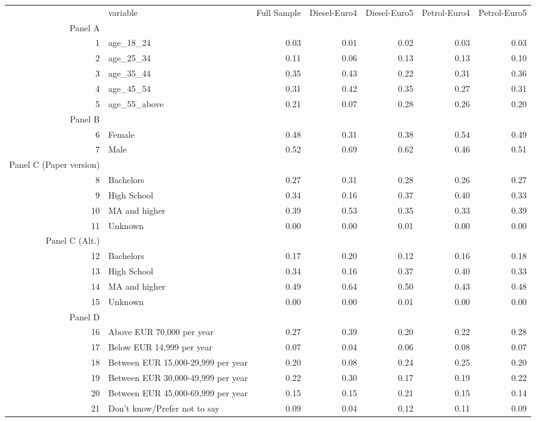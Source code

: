 \begin{table}[ht]
\centering
\begin{tabular}{rlrrrrr}
  \hline
 & variable & Full Sample & Diesel-Euro4 & Diesel-Euro5 & Petrol-Euro4 & Petrol-Euro5 \\ 
  Panel A & \multicolumn{5}{c}{} \\ 
 \hline
1 & age\_18\_24 & 0.03 & 0.01 & 0.02 & 0.03 & 0.03 \\ 
  2 & age\_25\_34 & 0.11 & 0.06 & 0.13 & 0.13 & 0.10 \\ 
  3 & age\_35\_44 & 0.35 & 0.43 & 0.22 & 0.31 & 0.36 \\ 
  4 & age\_45\_54 & 0.31 & 0.42 & 0.35 & 0.27 & 0.31 \\ 
  5 & age\_55\_above & 0.21 & 0.07 & 0.28 & 0.26 & 0.20 \\ 
   Panel B & \multicolumn{5}{c}{} \\ 
6 & Female & 0.48 & 0.31 & 0.38 & 0.54 & 0.49 \\ 
  7 & Male & 0.52 & 0.69 & 0.62 & 0.46 & 0.51 \\ 
   Panel C (Paper version) & \multicolumn{5}{c}{} \\ 
8 & Bachelors & 0.27 & 0.31 & 0.28 & 0.26 & 0.27 \\ 
  9 & High School & 0.34 & 0.16 & 0.37 & 0.40 & 0.33 \\ 
  10 & MA and higher & 0.39 & 0.53 & 0.35 & 0.33 & 0.39 \\ 
  11 & Unknown & 0.00 & 0.00 & 0.01 & 0.00 & 0.00 \\ 
   Panel C (Alt.) & \multicolumn{5}{c}{} \\ 
12 & Bachelors & 0.17 & 0.20 & 0.12 & 0.16 & 0.18 \\ 
  13 & High School & 0.34 & 0.16 & 0.37 & 0.40 & 0.33 \\ 
  14 & MA and higher & 0.49 & 0.64 & 0.50 & 0.43 & 0.48 \\ 
  15 & Unknown & 0.00 & 0.00 & 0.01 & 0.00 & 0.00 \\ 
   Panel D & \multicolumn{5}{c}{} \\ 
16 & Above EUR 70,000 per year & 0.27 & 0.39 & 0.20 & 0.22 & 0.28 \\ 
  17 & Below EUR 14,999 per year & 0.07 & 0.04 & 0.06 & 0.08 & 0.07 \\ 
  18 & Between EUR 15,000-29,999 per year & 0.20 & 0.08 & 0.24 & 0.25 & 0.20 \\ 
  19 & Between EUR 30,000-49,999 per year & 0.22 & 0.30 & 0.17 & 0.19 & 0.22 \\ 
  20 & Between EUR 45,000-69,999 per year & 0.15 & 0.15 & 0.21 & 0.15 & 0.14 \\ 
  21 & Don't know/Prefer not to say & 0.09 & 0.04 & 0.12 & 0.11 & 0.09 \\ 
   \hline
\end{tabular}
\end{table}
